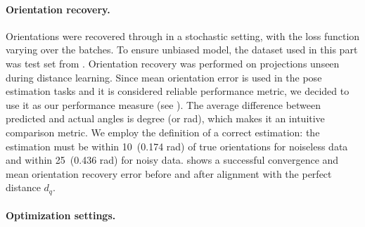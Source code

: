 \paragraph{Orientation recovery.}
Orientations were recovered through  in a stochastic setting, with the loss function varying over the batches.
To ensure unbiased model, the dataset used in this part was test set from .
Orientation recovery was performed on projections unseen during distance learning.
Since mean orientation error is used in the pose estimation tasks and it is considered reliable performance metric, we decided to use it as our performance measure (see ). The average difference between predicted and actual angles is degree (or rad), which makes it an intuitive comparison metric.
We employ the definition of a correct estimation: the estimation must be within 10\degree~(0.174 rad) of true orientations for noiseless data and within 25\degree~(0.436 rad) for noisy data.
 shows a successful convergence and mean orientation recovery error before and after alignment with the perfect distance $d_q$.

\paragraph{Optimization settings.}

